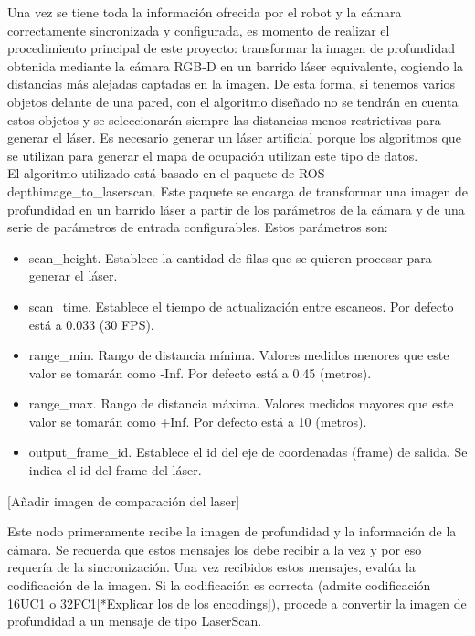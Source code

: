 Una vez se tiene toda la información ofrecida por el robot y la cámara correctamente sincronizada y configurada, es momento de realizar el procedimiento principal de este proyecto: transformar la imagen de profundidad obtenida mediante la cámara RGB-D en un barrido láser equivalente, cogiendo la distancias más alejadas captadas en la imagen. De esta forma, si tenemos varios objetos delante de una pared, con el algoritmo diseñado no se tendrán en cuenta estos objetos y se seleccionarán siempre las distancias menos restrictivas para generar el láser. Es necesario generar un láser artificial porque los algoritmos que se utilizan para generar el mapa de ocupación utilizan este tipo de datos.\\

El algoritmo utilizado está basado en el paquete de ROS depthimage\_to\_laserscan. Este paquete se encarga de transformar una imagen de profundidad en un barrido láser a partir de los parámetros de la cámara y de una serie de parámetros de entrada configurables. Estos parámetros son:

\begin{itemize}

	\item scan\_height. Establece la cantidad de filas que se quieren procesar para generar el láser. 
	\item scan\_time. Establece el tiempo de actualización entre escaneos. Por defecto está a 0.033 (30 FPS).
	\item range\_min. Rango de distancia mínima. Valores medidos menores que este valor se tomarán como -Inf. Por defecto está a 0.45 (metros).
	\item range\_max. Rango de distancia máxima. Valores medidos mayores que este valor se tomarán como +Inf. Por defecto está a 10 (metros).
	\item output\_frame\_id. Establece el id del eje de coordenadas (frame) de salida. Se indica el id del frame del láser.

\end{itemize}

[Añadir imagen de comparación del laser]

Este nodo primeramente recibe la imagen de profundidad y la información de la cámara. Se recuerda que estos mensajes los debe recibir a la vez y por eso requería de la sincronización. Una vez recibidos estos mensajes, evalúa la codificación de la imagen. Si la codificación es correcta (admite codificación 16UC1 o 32FC1[*Explicar los de los encodings]), procede a convertir la imagen de profundidad a un mensaje de tipo LaserScan.\\

